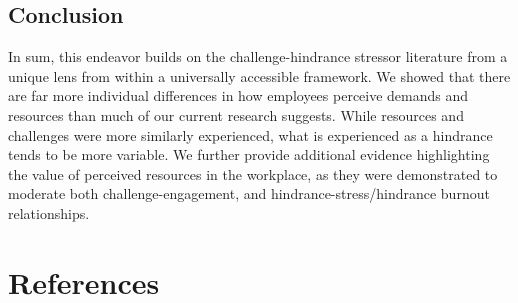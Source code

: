 \documentclass[
  man]{apa7}
\begin{document}
\subsection{Conclusion}\label{conclusion}

In sum, this endeavor builds on the challenge-hindrance stressor literature from a unique lens from within a universally accessible framework. We showed that there are far more individual differences in how employees perceive demands and resources than much of our current research suggests. While resources and challenges were more similarly experienced, what is experienced as a hindrance tends to be more variable. We further provide additional evidence highlighting the value of perceived resources in the workplace, as they were demonstrated to moderate both challenge-engagement, and hindrance-stress/hindrance burnout relationships.

\section{References}\label{references}

\begingroup
\setlength{\parindent}{-0.5in}
\setlength{\leftskip}{0.5in}
\end{document}

